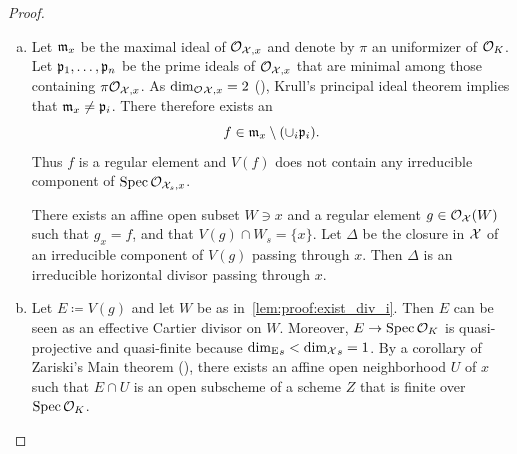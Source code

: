 \begin{proof}
    \begin{enumerate}[(a)]
        \item Let $\mathfrak m_x$ be the maximal ideal of $\mathcal{O}_{\mathcal X,x}$ and denote by $\pi$ an uniformizer of $\mathcal{O}_K$.
            Let $ \mathfrak p_1, \dots, \mathfrak p_n $ be the prime ideals of $\mathcal{O}_{\mathcal X,x}$ that are minimal among those containing $\pi \mathcal{O}_{\mathcal X,x}$.
            As $\operatorname{dim_{\mathcal{O}}}_{\mathcal X,x} = 2$ (\cite[Proposition 8.3.4]{Liu}), Krull's principal ideal theorem implies that $\mathfrak m_x \not= \mathfrak p_i$.
            There therefore exists an
            \[
                f \in \mathfrak m_x \setminus (\cup_i \mathfrak p_i).
            \]
            Thus $f$ is a regular element and $V(f)$ does not contain any irreducible component of $\operatorname{Spec} \mathcal{O}_{\mathcal X_s, x}$.

            There exists an affine open subset $W \ni x$ and a regular element $g \in \mathcal{O}_\mathcal X(W)$ such that $g_x = f$,
            and that $V(g) \cap W_s = \{x\}$.
            Let $\Delta$ be the closure in $\mathcal X$ of an irreducible component of $V(g)$ passing through $x$.
            Then $\Delta$ is an irreducible horizontal divisor passing through $x$. \label{lem:proof:exist_div_i}
        \item Let $E \coloneqq V(g)$ and let $W$ be as in~\ref{lem:proof:exist_div_i}.
            Then $E$ can be seen as an effective Cartier divisor on $W$.
            Moreover, $E \to \operatorname{Spec} \mathcal{O}_K$ is quasi-projective and quasi-finite because $\operatorname{dim_{E}}_s < \operatorname{dim_{\mathcal X}}_s = 1$.
            By a corollary of Zariski's Main theorem (\cite[Corollary 4.4.8]{Liu}), there exists an affine open neighborhood
            $U$ of $x$ such that $E \cap U$ is an open subscheme of a scheme $Z$ that is finite over $\operatorname{Spec} \mathcal{O}_K$.

            \begin{center}
            \end{center}


\end{enumerate}
\end{proof}
